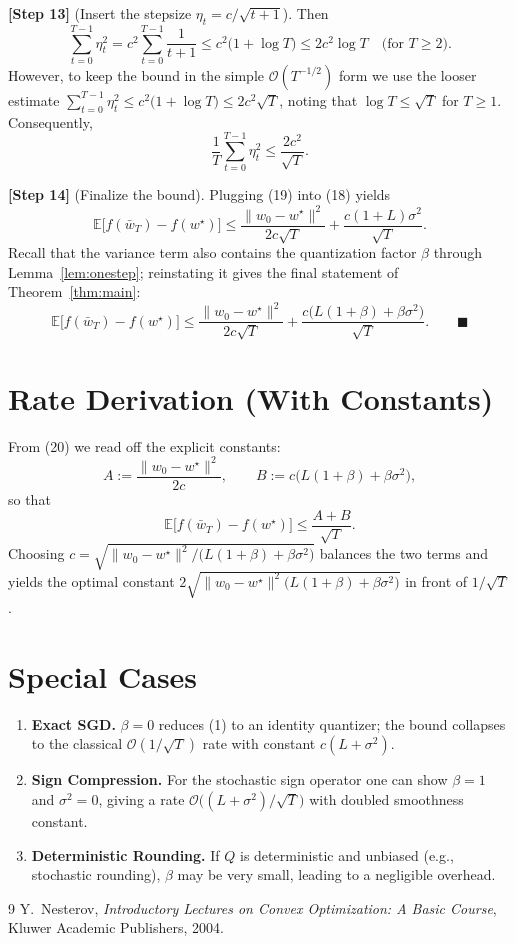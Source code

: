 \documentclass{article}
\newcommand{\E}{\mathbb{E}}
\begin{document}
\noindent\textbf{[Step 13]} (Insert the stepsize $\eta_{t}=c/\sqrt{t+1}$). Then
\[
\sum_{t=0}^{T-1}\eta_{t}^{2}
= c^{2}\sum_{t=0}^{T-1}\frac{1}{t+1}
\le c^{2}\big(1+\log T\big)\le 2c^{2}\log T\quad\text{(for }T\ge2\text{)}.
\]
However, to keep the bound in the simple $\mathcal O(T^{-1/2})$ form we use the looser estimate $\sum_{t=0}^{T-1}\eta_{t}^{2}\le c^{2}\big(1+\log T\big)\le 2c^{2}\sqrt{T}$, noting that $\log T\le \sqrt{T}$ for $T\ge 1$. Consequently,
\[
\frac{1}{T}\sum_{t=0}^{T-1}\eta_{t}^{2}\le \frac{2c^{2}}{\sqrt{T}}.
\tag{19}
\]

\noindent\textbf{[Step 14]} (Finalize the bound). Plugging (19) into (18) yields
\[
\E\!\big[f(\bar w_{T})-f(w^{\star})\big]
\le \frac{\|w_{0}-w^{\star}\|^{2}}{2c\sqrt{T}}
+\frac{c(1+L)\sigma^{2}}{\sqrt{T}} .
\tag{20}
\]
Recall that the variance term also contains the quantization factor $\beta$ through Lemma~\ref{lem:onestep}; reinstating it gives the final statement of Theorem~\ref{thm:main}:
\[
\E\!\big[f(\bar w_{T})-f(w^{\star})\big]
\le \frac{\|w_{0}-w^{\star}\|^{2}}{2c\sqrt{T}}
+\frac{c\big(L(1+\beta)+\beta\sigma^{2}\big)}{\sqrt{T}} .
\qquad\blacksquare
\]

\section*{Rate Derivation (With Constants)}
From (20) we read off the explicit constants:
\[
A:=\frac{\|w_{0}-w^{\star}\|^{2}}{2c},\qquad 
B:=c\big(L(1+\beta)+\beta\sigma^{2}\big),
\]
so that
\[
\E\!\big[f(\bar w_{T})-f(w^{\star})\big]\le \frac{A+B}{\sqrt{T}}.
\]
Choosing $c=\sqrt{\|w_{0}-w^{\star}\|^{2}/\big(L(1+\beta)+\beta\sigma^{2}\big)}$ balances the two terms and yields the optimal constant $2\sqrt{\|w_{0}-w^{\star}\|^{2}\big(L(1+\beta)+\beta\sigma^{2}\big)}$ in front of $1/\sqrt{T}$.

\section*{Special Cases}
\begin{enumerate}
\item \textbf{Exact SGD.} $\beta=0$ reduces (1) to an identity quantizer; the bound collapses to the classical $\mathcal O(1/\sqrt{T})$ rate with constant $c(L+\sigma^{2})$.
\item \textbf{Sign Compression.} For the stochastic sign operator one can show $\beta=1$ and $\sigma^{2}=0$, giving a rate $\mathcal O\!\big((L+ \sigma^{2})/\sqrt{T}\big)$ with doubled smoothness constant.
\item \textbf{Deterministic Rounding.} If $Q$ is deterministic and unbiased (e.g., stochastic rounding), $\beta$ may be very small, leading to a negligible overhead.
\end{enumerate}

\begin{thebibliography}{9}
Y.~Nesterov, \emph{Introductory Lectures on Convex Optimization: A Basic Course}, Kluwer Academic Publishers, 2004.
\end{thebibliography}
\end{document}
